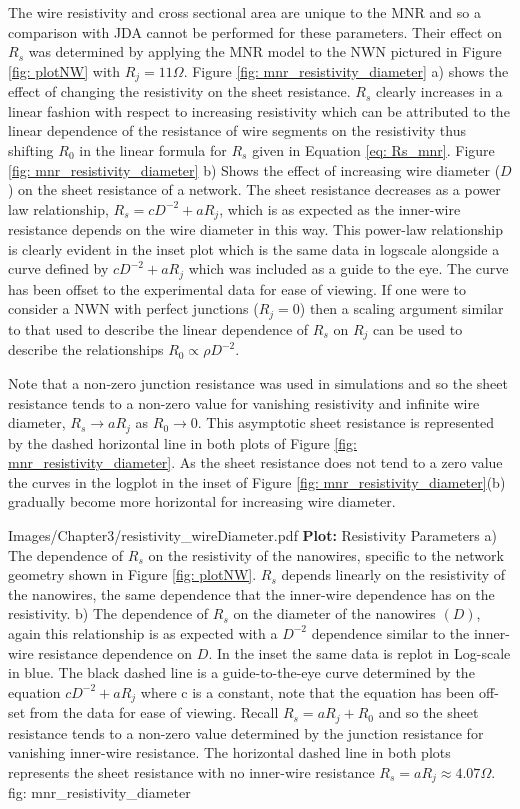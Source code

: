 The wire resistivity and cross sectional area are unique to the MNR and so a comparison with JDA cannot be performed for these parameters. Their effect on $R_s$ was determined by applying the MNR model to the NWN pictured in Figure \ref{fig: plotNW} with $R_j =11 \Omega$. Figure \ref{fig: mnr_resistivity_diameter} a) shows the effect of changing the resistivity on the sheet resistance. $R_s$ clearly increases in a linear fashion with respect to increasing resistivity which can be attributed to the linear dependence of the resistance of wire segments on the resistivity thus shifting $R_0$ in the linear formula for $R_s$ given in Equation \ref{eq: Rs_mnr}. Figure \ref{fig: mnr_resistivity_diameter} b) Shows the effect of increasing wire diameter ($D$) on the sheet resistance of a network. The sheet resistance decreases as a power law relationship, $R_s = c  D^{-2} + aR_j$, which is as expected as the inner-wire resistance depends on the wire diameter in this way. This power-law relationship is clearly evident in the inset plot which is the same data in logscale alongside a curve defined by $c  D^{-2} + aR_j$ which was included as a guide to the eye. The curve has been offset to the experimental data for ease of viewing. If one were to consider a NWN with perfect junctions ($R_j = 0$) then a scaling argument similar to that used to describe the linear dependence of $R_s$ on $R_j$ can be used to describe the relationships $R_0 \propto \rho D^{-2}$.

Note that a non-zero junction resistance was used in simulations and so the sheet resistance tends to a non-zero value for vanishing resistivity and infinite wire diameter, $R_s \rightarrow a R_j$ as $R_0 \rightarrow 0$. This asymptotic sheet resistance is represented by the dashed horizontal line in both plots of Figure \ref{fig: mnr_resistivity_diameter}. As the sheet resistance does not tend to a zero value the curves in the logplot in the inset of Figure \ref{fig: mnr_resistivity_diameter}(b) gradually become more horizontal for increasing wire diameter.

{Images/Chapter3/resistivity_wireDiameter.pdf}
{\textbf{Plot:} Resistivity Parameters}
{a) The dependence of $R_s$ on the resistivity of the nanowires, specific to the network geometry shown in Figure \ref{fig: plotNW}. $R_s$ depends linearly on the resistivity of the nanowires, the same dependence that the inner-wire dependence has on the resistivity. b) The dependence of $R_s$ on the diameter of the nanowires $(D)$, again this relationship is as expected with a $D^{-2}$ dependence similar to the inner-wire resistance dependence on $D$. In the inset the same data is replot in Log-scale in blue. The black dashed line is a guide-to-the-eye curve determined by the equation $c D^{-2} + a R_j$ where c is a constant, note that the equation has been off-set from the data for ease of viewing. Recall $R_s = a R_j + R_0$ and so the sheet resistance tends to a non-zero value determined by the junction resistance for vanishing inner-wire resistance. The horizontal dashed line in both plots represents the sheet resistance with no inner-wire resistance $R_s = aR_j \approx 4.07 \Omega$.}
{fig: mnr_resistivity_diameter}

